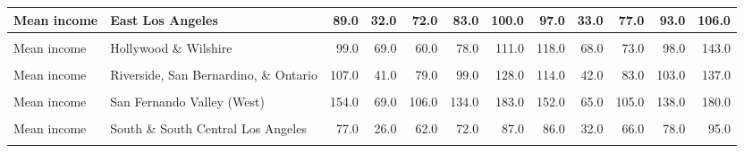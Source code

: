 \begin{table}[!h]
\begin{tabular}[t]{l|>{}l||r|r|r|r|r|r|r|r|r|r}
\hline
Mean income & East Los Angeles & 89.0 & 32.0 & 72.0 & 83.0 & 100.0 & 97.0 & 33.0 & 77.0 & 93.0 & 106.0\\
\hline
\cellcolor{gray!6}{Mean income} & \cellcolor{gray!6}{Glendale and Pasadena} & \cellcolor{gray!6}{124.0} & \cellcolor{gray!6}{56.0} & \cellcolor{gray!6}{86.0} & \cellcolor{gray!6}{108.0} & \cellcolor{gray!6}{138.0} & \cellcolor{gray!6}{135.0} & \cellcolor{gray!6}{57.0} & \cellcolor{gray!6}{96.0} & \cellcolor{gray!6}{121.0} & \cellcolor{gray!6}{157.0}\\
\hline
Mean income & Hollywood \& Wilshire & 99.0 & 69.0 & 60.0 & 78.0 & 111.0 & 118.0 & 68.0 & 73.0 & 98.0 & 143.0\\
\hline
\cellcolor{gray!6}{Mean income} & \cellcolor{gray!6}{Long Beach} & \cellcolor{gray!6}{106.0} & \cellcolor{gray!6}{49.0} & \cellcolor{gray!6}{72.0} & \cellcolor{gray!6}{102.0} & \cellcolor{gray!6}{129.0} & \cellcolor{gray!6}{113.0} & \cellcolor{gray!6}{45.0} & \cellcolor{gray!6}{80.0} & \cellcolor{gray!6}{104.0} & \cellcolor{gray!6}{137.0}\\
\hline
Mean income & Riverside, San Bernardino, \& Ontario & 107.0 & 41.0 & 79.0 & 99.0 & 128.0 & 114.0 & 42.0 & 83.0 & 103.0 & 137.0\\
\hline
\cellcolor{gray!6}{Mean income} & \cellcolor{gray!6}{San Fernando Valley (East)} & \cellcolor{gray!6}{133.0} & \cellcolor{gray!6}{105.0} & \cellcolor{gray!6}{78.0} & \cellcolor{gray!6}{97.0} & \cellcolor{gray!6}{128.0} & \cellcolor{gray!6}{137.0} & \cellcolor{gray!6}{89.0} & \cellcolor{gray!6}{84.0} & \cellcolor{gray!6}{109.0} & \cellcolor{gray!6}{154.0}\\
\hline
Mean income & San Fernando Valley (West) & 154.0 & 69.0 & 106.0 & 134.0 & 183.0 & 152.0 & 65.0 & 105.0 & 138.0 & 180.0\\
\hline
\cellcolor{gray!6}{Mean income} & \cellcolor{gray!6}{Santa Ana} & \cellcolor{gray!6}{145.0} & \cellcolor{gray!6}{64.0} & \cellcolor{gray!6}{102.0} & \cellcolor{gray!6}{133.0} & \cellcolor{gray!6}{167.0} & \cellcolor{gray!6}{152.0} & \cellcolor{gray!6}{62.0} & \cellcolor{gray!6}{108.0} & \cellcolor{gray!6}{139.0} & \cellcolor{gray!6}{174.0}\\
\hline
Mean income & South \& South Central Los Angeles & 77.0 & 26.0 & 62.0 & 72.0 & 87.0 & 86.0 & 32.0 & 66.0 & 78.0 & 95.0\\
\hline
\cellcolor{gray!6}{Mean income} & \cellcolor{gray!6}{South Bay} & \cellcolor{gray!6}{141.0} & \cellcolor{gray!6}{78.0} & \cellcolor{gray!6}{89.0} & \cellcolor{gray!6}{118.0} & \cellcolor{gray!6}{164.0} & \cellcolor{gray!6}{149.0} & \cellcolor{gray!6}{77.0} & \cellcolor{gray!6}{95.0} & \cellcolor{gray!6}{124.0} & \cellcolor{gray!6}{180.0}\\

\end{tabular}
\end{table}
